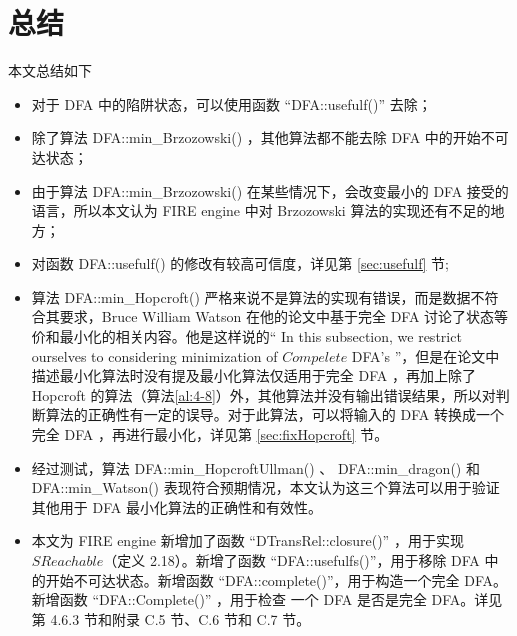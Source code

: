 \chapter{总结}\label{cha:conlusion}

本文总结如下
\begin{itemize}
    \item 对于 DFA 中的陷阱状态，可以使用函数 “DFA::usefulf()” 去除；
    \item 除了算法 DFA::min\_Brzozowski() ，其他算法都不能去除 DFA 中的开始不可达状态；
    \item 由于算法 DFA::min\_Brzozowski() 在某些情况下，会改变最小的 DFA 接受的语言，所以本文认为 FIRE engine 中对 Brzozowski 算法的实现还有不足的地方；
    \item 对函数 DFA::usefulf() 的修改有较高可信度，详见第 \ref{sec:usefulf} 节;
    \item 算法 DFA::min\_Hopcroft() 严格来说不是算法的实现有错误，而是数据不符合其要求，Bruce William Watson 在他的论文\cite[第三节]{watson1993taxonomyb}中基于完全 DFA 讨论了状态等价和最小化的相关内容。他是这样说的“ In this subsection, we restrict ourselves to considering minimization of $Compelete$ DFA's ”，但是在论文\cite[第四节]{watson1993taxonomyb}中描述最小化算法时没有提及最小化算法仅适用于完全 DFA ，再加上除了 Hopcroft 的算法（算法\ref{al:4-8}）外，其他算法并没有输出错误结果，所以对判断算法的正确性有一定的误导。对于此算法，可以将输入的 DFA 转换成一个完全 DFA ，再进行最小化，详见第 \ref{sec:fixHopcroft} 节。
    \item 经过测试，算法 DFA::min\_HopcroftUllman() 、 DFA::min\_dragon() 和 DFA::min\_Watson() 表现符合预期情况，本文认为这三个算法可以用于验证其他用于 DFA 最小化算法的正确性和有效性。
    \item 本文为 FIRE engine 新增加了函数 “DTransRel::closure()” ，用于实现 $SReachable$（定义 2.18）。新增了函数 “DFA::usefulfs()”，用于移除 DFA 中的开始不可达状态。新增函数 “DFA::complete()”，用于构造一个完全 DFA。新增函数 “DFA::Complete()” ，用于检查 一个 DFA 是否是完全 DFA。详见第 4.6.3 节和附录 C.5 节、C.6 节和 C.7 节。
\end{itemize}


